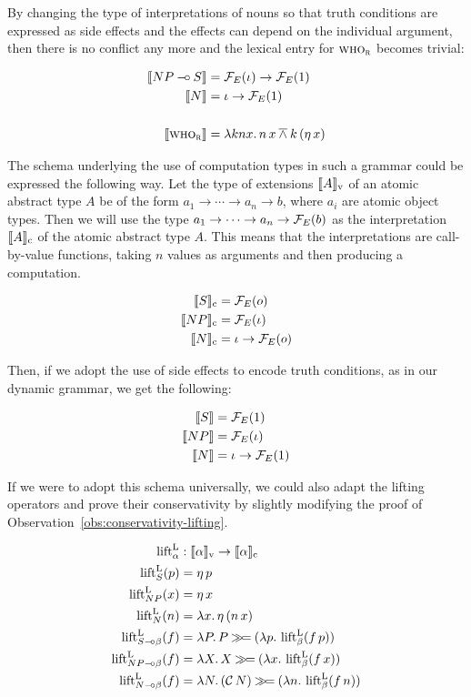By changing the type of interpretations of nouns so that truth conditions
are expressed as side effects and the effects can depend on the individual
argument, then there is no conflict any more and the lexical entry for
$\textsc{who}_{\textsc{r}}$ becomes trivial:

\begin{align*}
  \llbracket NP \mathbin{{-}\mkern-3.5mu{\circ}} S \rrbracket &= \mathcal{F}_E(\iota) \to \mathcal{F}_E(1) \\
  \llbracket N \rrbracket &= \iota \to \mathcal{F}_E(1) \\
  \\
  \llbracket \textsc{who}_{\textsc{r}} \rrbracket &= \lambda k n x.\, n\,x \mathbin{\overline{\land}} k\,(\eta\,x)
\end{align*}

The schema underlying the use of computation types in such a grammar could
be expressed the following way. Let the type of extensions
$\llbracket A \rrbracket_{\mathrm{v}}$ of an atomic abstract type $A$ be of the form
$a_1 \to \cdots \to a_n \to b$, where $a_i$ are atomic object types. Then
we will use the type $a_1 \to \cdots \to a_n \to \mathcal{F}_E(b)$ as the
interpretation $\llbracket A \rrbracket_{\mathrm{c}}$ of the atomic abstract type $A$. This
means that the interpretations are call-by-value functions, taking $n$
values as arguments and then producing a computation.

\begin{align*}
  \llbracket S \rrbracket_{\mathrm{c}} &= \mathcal{F}_E(o) \\
  \llbracket NP \rrbracket_{\mathrm{c}} &= \mathcal{F}_E(\iota) \\
  \llbracket N \rrbracket_{\mathrm{c}} &= \iota \to \mathcal{F}_E(o)
\end{align*}

Then, if we adopt the use of side effects to encode truth conditions, as in
our dynamic grammar, we get the following:

\begin{align*}
  \llbracket S \rrbracket &= \mathcal{F}_E(1) \\
  \llbracket NP \rrbracket &= \mathcal{F}_E(\iota) \\
  \llbracket N \rrbracket &= \iota \to \mathcal{F}_E(1)
\end{align*}

If we were to adopt this schema universally, we could also adapt the
lifting operators and prove their conservativity by slightly modifying the
proof of Observation~\ref{obs:conservativity-lifting}.

\begin{align*}
  \operatorname{lift}^{\mathrm{L}}_\alpha &: \llbracket \alpha \rrbracket_{\mathrm{v}} \to \llbracket \alpha \rrbracket_{\mathrm{c}} \\
  \operatorname{lift}^{\mathrm{L}}_{S}(p) &= \eta\,p \\
  \operatorname{lift}^{\mathrm{L}}_{NP}(x) &= \eta\,x \\
  \operatorname{lift}^{\mathrm{L}}_{N}(n) &= \lambda x.\, \eta\,(n\,x) \\
  \operatorname{lift}^{\mathrm{L}}_{S \mathbin{{-}\mkern-3.5mu{\circ}} \beta}(f) &= \lambda P.\, P \mathbin{\gg\!=} (\lambda p.\, \operatorname{lift}^{\mathrm{L}}_\beta(f\,p)) \\
  \operatorname{lift}^{\mathrm{L}}_{NP \mathbin{{-}\mkern-3.5mu{\circ}} \beta}(f) &= \lambda X.\, X \mathbin{\gg\!=} (\lambda x.\, \operatorname{lift}^{\mathrm{L}}_\beta(f\,x)) \\
  \operatorname{lift}^{\mathrm{L}}_{N \mathbin{{-}\mkern-3.5mu{\circ}} \beta}(f) &= \lambda N.\, (\mathcal{C}\,N) \mathbin{\gg\!=} (\lambda n.\, \operatorname{lift}^{\mathrm{L}}_\beta(f\,n))
\end{align*}

